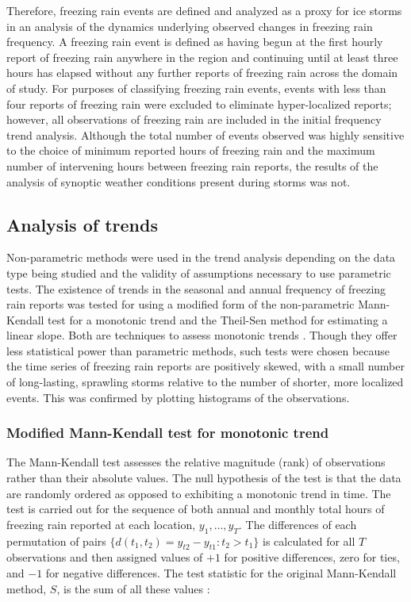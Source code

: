\documentclass[twocol]{ametsoc}
\begin{document}
Therefore, freezing rain events are defined and analyzed as a proxy for ice storms in an analysis of the dynamics underlying observed changes in freezing rain frequency. A freezing rain event is defined as having begun at the first hourly report of freezing rain anywhere in the region and continuing until at least three hours has elapsed without any further reports of freezing rain across the domain of study. For purposes of classifying freezing rain events, events with less than four reports of freezing rain were excluded to eliminate hyper-localized reports; however, all observations of freezing rain are included in the initial frequency trend analysis. Although the total number of events observed was highly sensitive to the choice of minimum reported hours of freezing rain and the maximum number of intervening hours between freezing rain reports, the results of the analysis of synoptic weather conditions present during storms was not.

\subsection{Analysis of trends}
Non-parametric methods were used in the trend analysis depending on the data type being studied and the validity of assumptions necessary to use parametric tests. The existence of trends in the seasonal and annual frequency of freezing rain reports was tested for using a modified form of the non-parametric Mann-Kendall test for a monotonic trend and the Theil-Sen method for estimating a linear slope. Both are techniques to assess monotonic trends \citep{chandler2011statistical}. Though they offer less statistical power than parametric methods, such tests were chosen because the time series of freezing rain reports are positively skewed, with a small number of long-lasting, sprawling storms relative to the number of shorter, more localized events. This was confirmed by plotting histograms of the observations.

\subsubsection{Modified Mann-Kendall test for monotonic trend}
The Mann-Kendall test assesses the relative magnitude (rank) of observations rather than their absolute values. The null hypothesis of the test is that the data are randomly ordered as opposed to exhibiting a monotonic trend in time. The test is carried out for the sequence of both annual and monthly total hours of freezing rain reported at each location, $y_1,\ldots,y_T$. The differences of each permutation of pairs $\{d(t_1,t_2)=y_{t2}-y_{t1}:t_2>t_1\}$ is calculated for all $T$ observations and then assigned values of $+1$ for positive differences, zero for ties, and $-1$ for negative differences. The test statistic for the original Mann-Kendall method, $S$, is the sum of all these values :
\end{document}
